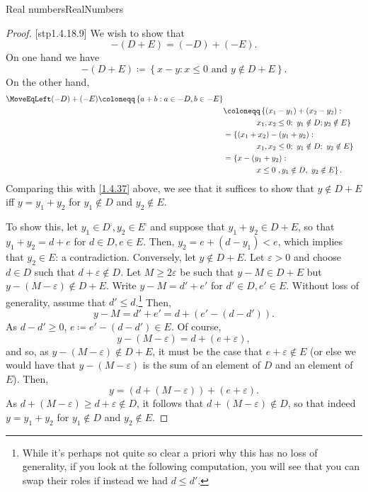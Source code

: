 \begin{thm}{Real numbers}{RealNumbers}
\begin{proof}
[stp1.4.18.9]
We wish to show that
\begin{equation}
-(D+E)=(-D)+(-E).
\end{equation}
On one hand we have
\begin{equation}\label{1.4.37}
-(D+E)\coloneqq \left\{ x-y:x\leq 0\text{ and }y\notin D+E\right\} .
\end{equation}
On the other hand,
\begin{equation}
\begin{split}
\MoveEqLeft
(-D)+(-E)\coloneqq \left\{ a+b:a\in -D,b\in -E\right\} \\
& \coloneqq \left\{ (x_1-y_1)+(x_2-y_2):\right. \\ & \qquad \qquad \left. x_1,x_2\leq 0;\ y_1\notin D;y_2\notin E\right\} \\
& =\left\{ (x_1+x_2)-(y_1+y_2):\right. \\ & \qquad \qquad \left. x_1,x_2\leq 0;\ y_1\notin D;\ y_2\notin E\right\} \\
& =\left\{ x-(y_1+y_2):\right. \\ & \qquad \qquad \left. x\leq 0\ ,y_1\notin D,\ y_2\notin E\right\} .
\end{split}
\end{equation}
Comparing this with \eqref{1.4.37} above, we see that it suffices to show that $y\notin D+E$ iff $y=y_1+y_2$ for $y_1\notin D$ and $y_2\notin E$.

To show this, let $y_1\in D^{\comp},y_2\in E^{\comp}$ and suppose that $y_1+y_2\in D+E$, so that $y_1+y_2=d+e$ for $d\in D,e\in E$.  Then, $y_2=e+(d-y_1)<e$, which implies that $y_2\in E$:  a contradiction.  Conversely, let $y\notin D+E$.  Let $\varepsilon >0$ and choose $d\in D$ such that $d+\varepsilon \notin D$.  Let $M\geq 2\varepsilon$ be such that $y-M\in D+E$ but $y-(M-\varepsilon )\notin D+E$.  Write $y-M=d'+e'$ for $d'\in D,e'\in E$.  Without loss of generality, assume that $d'\leq d$.\footnote{While it's perhaps not quite so clear a priori why this has no loss of generality, if you look at the following computation, you will see that you can swap their roles if instead we had $d\leq d'$.}  Then,
\begin{equation}
y-M=d'+e'=d+\left( e'-(d-d')\right) .
\end{equation}
As $d-d'\geq 0$, $e\coloneqq e'-(d-d')\in E$.  Of course,
\begin{equation}
y-(M-\varepsilon )=d+(e+\varepsilon ),
\end{equation}
and so, as $y-(M-\varepsilon )\notin D+E$, it must be the case that $e+\varepsilon \notin E$ (or else we would have that $y-(M-\varepsilon )$ is the sum of an element of $D$ and an element of $E$).  Then,
\begin{equation}
y=\left( d+(M-\varepsilon )\right) +(e+\varepsilon ).
\end{equation}
As $d+(M-\varepsilon )\geq d+\varepsilon \notin D$, it follows that $d+(M-\varepsilon )\notin D$, so that indeed $y=y_1+y_2$ for $y_1\notin D$ and $y_2\notin E$.


\end{proof}
\end{thm}
